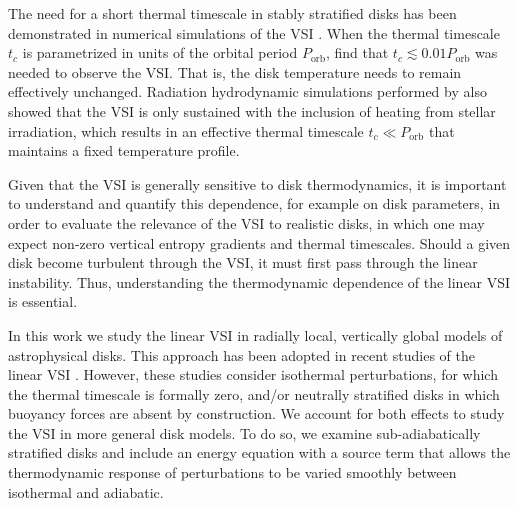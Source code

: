\documentclass[iop]{emulateapj}
\begin{document}
The need for a short thermal timescale in stably stratified disks has
been demonstrated in numerical simulations of the VSI
\citep{nelson13,stoll14}. When the  thermal timescale $t_c$ is
parametrized in units of the orbital period  $P_\mathrm{orb}$,
\cite{nelson13} find that $t_c\lesssim  0.01P_\mathrm{orb}$ was needed
to observe the VSI. That is, the  disk temperature needs to remain
effectively unchanged. Radiation hydrodynamic simulations performed by
\cite{stoll14} also showed that the VSI is only sustained with the
inclusion of heating from stellar irradiation, which results in an
effective thermal timescale $t_c\ll P_\mathrm{orb}$ that maintains a
fixed temperature profile.     

Given that the VSI is generally sensitive to disk thermodynamics,  
it is important to understand and quantify this dependence, for
example on disk parameters, in order to evaluate the 
relevance of the VSI to realistic disks, in which one may expect
non-zero vertical entropy gradients and thermal timescales. Should a
given disk become turbulent through the VSI, it must first pass
through the linear instability. Thus, understanding the thermodynamic
dependence of the  linear VSI is essential.   

In this work we study the linear VSI in radially local, vertically
global models of astrophysical disks. This approach has
been adopted in recent studies of the linear VSI
\citep{nelson13,mcnally14,barker15}. However, these studies consider 
isothermal perturbations, for which the thermal timescale is formally
zero, and/or neutrally stratified disks in which buoyancy forces are
absent by construction. We account for both effects to study the
VSI in more general disk models. To do so, we examine 
sub-adiabatically stratified disks and include an energy equation 
with a source term that allows the thermodynamic response of 
perturbations to be varied smoothly between isothermal and 
adiabatic.   

\end{document}
